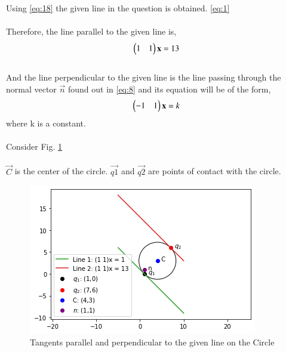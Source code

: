 \documentclass[journal,12pt,twocolumn]{IEEEtran}
\begin{document}
Using \eqref{eq:18} the given line in the question is obtained. \eqref{eq:1}\\\\
Therefore, the line parallel to the given line is,
\begin{align}
\begin{pmatrix}1 & 1\end{pmatrix}\mathbf{x} = 13 \label{eq:22}
\end{align}\\
And the line perpendicular to the given line is the line passing through the normal vector $\vec{n}$ found out in \eqref{eq:8} and its equation will be of the form,
\begin{equation}
    \begin{pmatrix}-1 & 1\end{pmatrix}\mathbf{x} = k \label{eq:23}
\end{equation}
where k is a constant.\\\\
Consider Fig. \ref{Fig.1} 
\\\\ $\vec{C}$ is the center of the circle. $\vec{q1}$ and $\vec{q2}$ are points of contact with the circle.
\begin{figure}[!htb]
    \includegraphics{Figure.png}
    \caption{Tangents parallel and perpendicular to the given line on the Circle}
    \label{Fig.1}
\end{figure}
\end{document}
